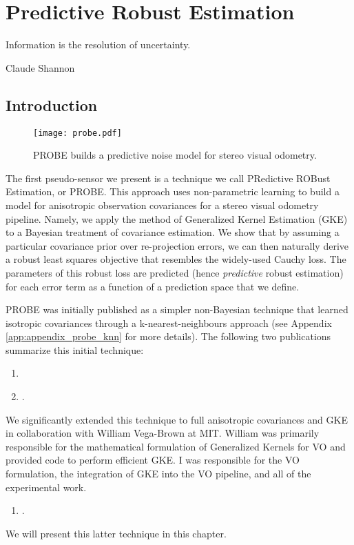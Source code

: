 \chapter{Predictive Robust Estimation}
\label{ch:probe}
\epigraph{Information is the resolution of uncertainty.}{Claude Shannon}

\section{Introduction}

\begin{figure*}[h!]
\centering
\texttt{[image: probe.pdf]}
 \caption{PROBE builds a predictive noise model for stereo visual odometry.}
 \label{fig:probe_intro_fig}
\end{figure*}

The first pseudo-sensor we present is a technique we call PRedictive ROBust Estimation, or PROBE. This approach uses non-parametric learning to build a model for anisotropic observation covariances for a stereo visual odometry pipeline. Namely, we apply the method of Generalized Kernel Estimation (GKE) to a Bayesian treatment of covariance estimation. We show that by assuming a particular covariance prior over re-projection errors, we can then naturally derive a robust least squares objective that resembles the widely-used Cauchy loss. The parameters of this robust loss are predicted (hence \textit{predictive} robust estimation) for each error term as a function of a prediction space that we define.

PROBE was initially published as a simpler non-Bayesian technique that learned isotropic covariances through a k-nearest-neighbours approach (see Appendix \ref{app:appendix_probe_knn} for more details).  The following two publications summarize this initial technique:
\begin{enumerate}
\item {}
\item {}.
\end{enumerate}

We significantly extended this technique to full anisotropic covariances and GKE in collaboration with William Vega-Brown at MIT. William was primarily responsible for the mathematical formulation of Generalized Kernels for VO and provided code to perform efficient GKE. I was responsible for the VO formulation, the integration of GKE into the VO pipeline, and all of the experimental work.
\begin{enumerate}
\item {}	.
\end{enumerate}
We will present this latter technique in this chapter.

